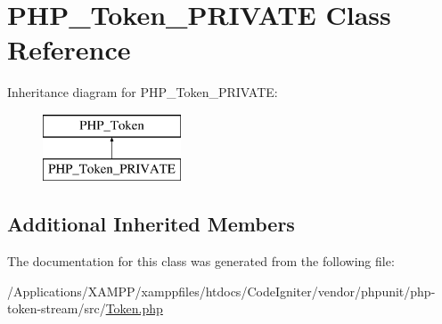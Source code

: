 \hypertarget{class_p_h_p___token___p_r_i_v_a_t_e}{}\section{P\+H\+P\+\_\+\+Token\+\_\+\+P\+R\+I\+V\+A\+TE Class Reference}
\label{class_p_h_p___token___p_r_i_v_a_t_e}
Inheritance diagram for P\+H\+P\+\_\+\+Token\+\_\+\+P\+R\+I\+V\+A\+TE\+:\begin{figure}[H]
\begin{center}
\leavevmode
\includegraphics[height=2.000000cm]{class_p_h_p___token___p_r_i_v_a_t_e}
\end{center}
\end{figure}
\subsection*{Additional Inherited Members}


The documentation for this class was generated from the following file\+:\begin{DoxyCompactItemize}
\item 
/\+Applications/\+X\+A\+M\+P\+P/xamppfiles/htdocs/\+Code\+Igniter/vendor/phpunit/php-\/token-\/stream/src/\mbox{\hyperlink{_token_8php}{Token.\+php}}\end{DoxyCompactItemize}
